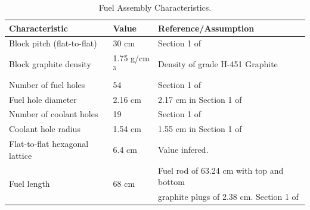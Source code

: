 \documentclass[11pt,letterpaper]{article}
\begin{document}
	\begin{table}[htbp!]
		\centering
	    \caption{Fuel Assembly Characteristics.}
	    \label{tab:fuel}
		\begin{tabular}{l|l|l}
		\hline
		Characteristic                   & Value         & Reference/Assumption \\ \hline
		Block pitch (flat-to-flat)       & 30 cm         & Section 1 of \cite{hawari_development_2018} \\
		Block graphite density           & 1.75 g/cm$^3$ & Density of grade H-451 Graphite \cite{gougar_prismatic_2010} \\
		Number of fuel holes             & 54            & Section 1 of \cite{hawari_development_2018} \\
		Fuel hole diameter               & 2.16 cm       & 2.17 cm in Section 1 of \cite{hawari_development_2018} \\
		Number of coolant holes          & 19            & Section 1 of \cite{hawari_development_2018} \\
		Coolant hole radius        		 & 1.54 cm       & 1.55 cm in Section 1 of \cite{hawari_development_2018} \\
		Flat-to-flat hexagonal lattice   & 6.4 cm        & Value infered. \\
		\multirow{ 2}{*}{Fuel length}    & \multirow{ 2}{*}{68 cm} & Fuel rod of 63.24 cm with top and bottom \\
                                         &               & graphite plugs of 2.38 cm. Section 1 of \cite{hawari_development_2018} \\ \hline
		\end{tabular}
	\end{table}
\end{document}
